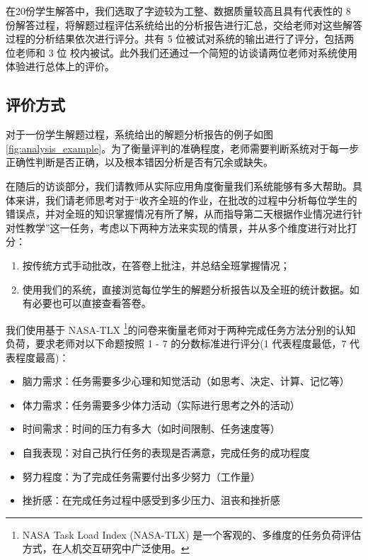 在20份学生解答中，我们选取了字迹较为工整、数据质量较高且具有代表性的 8 份解答过程，将解题过程评估系统给出的分析报告进行汇总，交给老师对这些解答过程的分析结果依次进行评分。共有 5 位被试对系统的输出进行了评分，包括两位老师和 3 位 校内被试。此外我们还通过一个简短的访谈请两位老师对系统使用体验进行总体上的评价。

\subsection{评价方式}

对于一份学生解题过程，系统给出的解题分析报告的例子如图\ref{fig:analysis_example}。为了衡量评判的准确程度，老师需要判断系统对于每一步正确性判断是否正确，以及根本错因分析是否有冗余或缺失。

在随后的访谈部分，我们请教师从实际应用角度衡量我们系统能够有多大帮助。具体来讲，我们请老师思考对于“收齐全班的作业，在批改的过程中分析每位学生的错误点，并对全班的知识掌握情况有所了解，从而指导第二天根据作业情况进行针对性教学”这一任务，考虑以下两种方法来实现的情景，并从多个维度进行对比打分：

\begin{enumerate}
    \item 按传统方式手动批改，在答卷上批注，并总结全班掌握情况；
    \item 使用我们的系统，直接浏览每位学生的解题分析报告以及全班的统计数据。如有必要也可以直接查看答卷。
\end{enumerate}

我们使用基于 NASA-TLX \footnote{NASA Task Load Index (NASA-TLX) 是一个客观的、多维度的任务负荷评估方式，在人机交互研究中广泛使用。}的问卷来衡量老师对于两种完成任务方法分别的认知负荷，要求老师对以下命题按照 1 - 7 的分数标准进行评分(1 代表程度最低，7 代表程度最高)：

\begin{itemize}
    \item 脑力需求：任务需要多少心理和知觉活动（如思考、决定、计算、记忆等）
    \item 体力需求：任务需要多少体力活动（实际进行思考之外的活动）
    \item 时间需求：时间的压力有多大（如时间限制、任务速度等）
    \item 自我表现：对自己执行任务的表现是否满意，完成任务的成功程度
    \item 努力程度：为了完成任务需要付出多少努力（工作量）
    \item 挫折感：在完成任务过程中感受到多少压力、沮丧和挫折感
\end{itemize}

